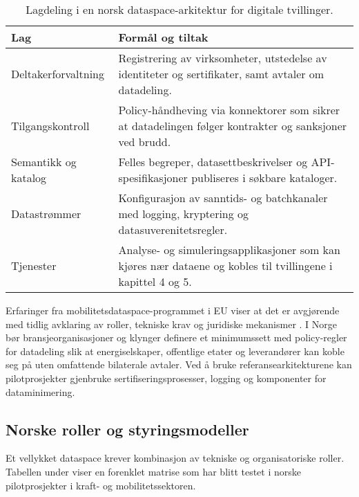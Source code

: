 \begin{table}[ht]
    \centering
    \caption{Lagdeling i en norsk dataspace-arkitektur for digitale tvillinger.}
    \label{tab:kap03-dataspace-lag}
    \begin{tabular}{p{}p{}}
        \toprule
        \textbf{Lag} & \textbf{Formål og tiltak} \\
        \midrule
        Deltakerforvaltning & Registrering av virksomheter, utstedelse av identiteter og sertifikater, samt avtaler om datadeling. \\
        Tilgangskontroll & Policy-håndheving via konnektorer som sikrer at datadelingen følger kontrakter og sanksjoner ved brudd. \\
        Semantikk og katalog & Felles begreper, datasettbeskrivelser og API-spesifikasjoner publiseres i søkbare kataloger. \\
        Datastrømmer & Konfigurasjon av sanntids- og batchkanaler med logging, kryptering og datasuverenitetsregler. \\
        Tjenester & Analyse- og simuleringsapplikasjoner som kan kjøres nær dataene og kobles til tvillingene i kapittel 4 og 5. \\
        \bottomrule
    \end{tabular}
\end{table}

Erfaringer fra mobilitetsdataspace-programmet i EU viser at det er avgjørende med tidlig avklaring av roller, tekniske krav og
juridiske mekanismer \citep{ec2023mobilitydataspace}. I Norge bør bransjeorganisasjoner og klynger definere et minimumssett med
policy-regler for datadeling slik at energiselskaper, offentlige etater og leverandører kan koble seg på uten omfattende
bilaterale avtaler. Ved å bruke referansearkitekturene kan pilotprosjekter gjenbruke sertifiseringsprosesser, logging og
komponenter for dataminimering.

\subsection{Norske roller og styringsmodeller}
Et vellykket dataspace krever kombinasjon av tekniske og organisatoriske roller. Tabellen under viser en forenklet matrise som
har blitt testet i norske pilotprosjekter i kraft- og mobilitetssektoren.

